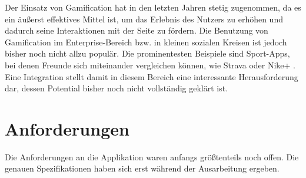 \documentclass[12pt,twoside]{book}
\begin{document}
Der Einsatz von Gamification hat in den letzten Jahren stetig zugenommen, da es ein äußerst effektives Mittel ist, um das Erlebnis des Nutzers zu erhöhen und dadurch seine Interaktionen mit der Seite zu fördern.
Die Benutzung von Gamification im Enterprise-Bereich bzw. in kleinen sozialen Kreisen ist jedoch bisher noch nicht allzu populär. Die prominentesten Beispiele sind Sport-Apps, bei denen Freunde sich miteinander vergleichen können, wie Strava \cite{strava} oder Nike+ \cite{nike}. Eine Integration stellt damit in diesem Bereich eine interessante Herausforderung dar, dessen Potential bisher noch nicht vollständig geklärt ist.


\section{Anforderungen}

Die Anforderungen an die Applikation waren anfangs größtenteils noch offen. Die genauen Spezifikationen haben sich erst während der Ausarbeitung ergeben.
\end{document}
